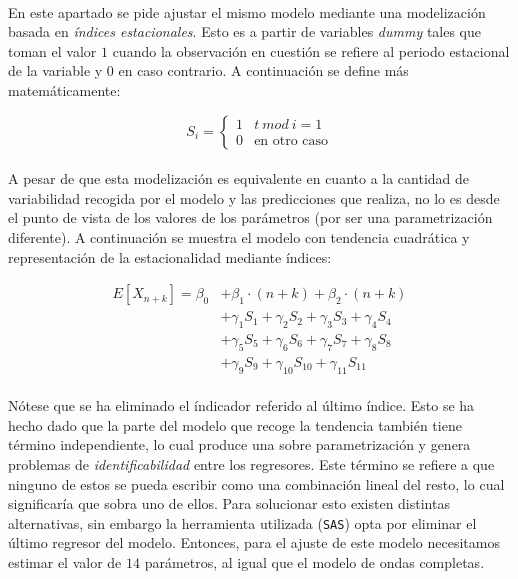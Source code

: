 \documentclass[a4paper, spanish]{article}
\begin{document}
    \paragraph{}
    En este apartado se pide ajustar el mismo modelo mediante una modelización basada en \emph{índices estacionales}. Esto es a partir de variables \emph{dummy} tales que toman el valor $1$ cuando la observación en cuestión se refiere al periodo estacional de la variable y $0$ en caso contrario. A continuación se define más matemáticamente:

    \begin{equation*}
      S_i =
      \begin{cases}
        1 & t \ mod \ i = 1 \\
        0 & \text{en otro caso}
     \end{cases}
    \end{equation*}

    \paragraph{}
    A pesar de que esta modelización es equivalente en cuanto a la cantidad de variabilidad recogida por el modelo y las predicciones que realiza, no lo es desde el punto de vista de los valores de los parámetros (por ser una parametrización diferente). A continuación se muestra el modelo con tendencia cuadrática y representación de la estacionalidad mediante índices:

    \begin{align*}
      E[X_{n + k}] = \beta_0 &+ \beta_1 \cdot (n + k) + \beta_2 \cdot(n + k) \\
      &+ \gamma_{1} S_{1} + \gamma_{2} S_{2} + \gamma_{3} S_{3} + \gamma_{4} S_{4} \\
      &+ \gamma_{5} S_{5} + \gamma_{6} S_{6} + \gamma_{7} S_{7} + \gamma_{8} S_{8} \\
      &+ \gamma_{9} S_{9} + \gamma_{10} S_{10}  + \gamma_{11} S_{11}
    \end{align*}

    \paragraph{}
    Nótese que se ha eliminado el índicador referido al último índice. Esto se ha hecho dado que la parte del modelo que recoge la tendencia también tiene término independiente, lo cual produce una sobre parametrización y genera problemas de \emph{identificabilidad} entre los regresores. Este término se refiere a que ninguno de estos se pueda escribir como una combinación lineal del resto, lo cual significaría que sobra uno de ellos. Para solucionar esto existen distintas alternativas, sin embargo la herramienta utilizada (\texttt{SAS}) opta por eliminar el último regresor del modelo. Entonces, para el ajuste de este modelo necesitamos estimar el valor de $14$ parámetros, al igual que el modelo de ondas completas.
\end{document}
